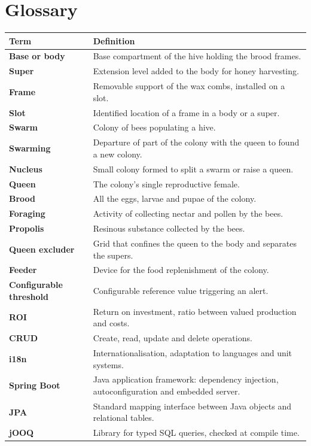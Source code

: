 \chapter{Glossary}
\begin{xltabular}{\textwidth}{>{\bfseries}p{4cm} X}
\toprule
\textbf{Term} & \textbf{Definition} \\
\midrule
\endhead
Base or body & Base compartment of the hive holding the brood frames. \\
Super & Extension level added to the body for honey harvesting. \\
Frame & Removable support of the wax combs, installed on a slot. \\
Slot & Identified location of a frame in a body or a super. \\
Swarm & Colony of bees populating a hive. \\
Swarming & Departure of part of the colony with the queen to found a new colony. \\
Nucleus & Small colony formed to split a swarm or raise a queen. \\
Queen & The colony's single reproductive female. \\
Brood & All the eggs, larvae and pupae of the colony. \\
Foraging & Activity of collecting nectar and pollen by the bees. \\
Propolis & Resinous substance collected by the bees. \\
Queen excluder & Grid that confines the queen to the body and separates the supers. \\
Feeder & Device for the food replenishment of the colony. \\
Configurable threshold & Configurable reference value triggering an alert. \\
ROI & Return on investment, ratio between valued production and costs. \\
CRUD & Create, read, update and delete operations. \\
i18n & Internationalisation, adaptation to languages and unit systems. \\
Spring Boot & Java application framework: dependency injection, autoconfiguration and embedded server. \\
JPA & Standard mapping interface between Java objects and relational tables. \\
jOOQ & Library for typed SQL queries, checked at compile time. \\

\end{xltabular}
